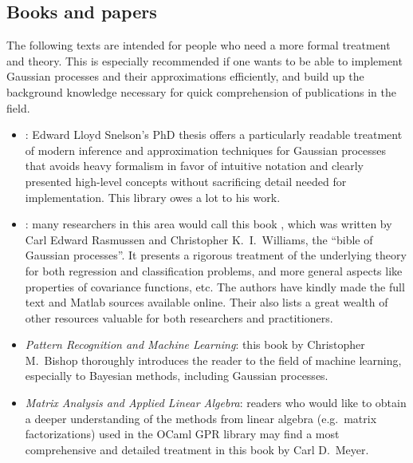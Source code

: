 \documentclass[10pt]{report}
\begin{document}
\subsection{Books and papers}

The following texts are intended for people who need a more formal treatment and
theory.  This is especially recommended if one wants to be able to implement
Gaussian processes and their approximations efficiently, and build up the
background knowledge necessary for quick comprehension of publications in the
field.

\begin{itemize}

\item
\emph{}: Edward Lloyd
Snelson's PhD thesis \cite{SnelsonThesis} offers a particularly readable
treatment of modern inference and approximation techniques for Gaussian
processes that avoids heavy formalism in favor of intuitive notation and
clearly presented high-level concepts without sacrificing detail needed
for implementation.  This library owes a lot to his work.

\item \emph{}: many researchers in this area would call this book
\cite{oai:eprints.pascal-network.org:1211}, which was written by Carl Edward
Rasmussen and Christopher K.\ I.\ Williams, the ``bible of Gaussian processes''.
It presents a rigorous treatment of the underlying theory for both regression
and classification problems, and more general aspects like properties of
covariance functions, etc.  The authors have kindly made the full text and
Matlab sources available online.  Their
 also lists
a great wealth of other resources valuable for both researchers and
practitioners.

\item \emph{Pattern Recognition and Machine Learning}: this book
\cite{BishopMachLearn} by Christopher M.\ Bishop thoroughly introduces the
reader to the field of machine learning, especially to Bayesian methods,
including Gaussian processes.

\item \emph{Matrix Analysis and Applied Linear Algebra}: readers who would like
to obtain a deeper understanding of the methods from linear algebra (e.g.\
matrix factorizations) used in the OCaml GPR library may find a most comprehensive and
detailed treatment in this book \cite{MatrixAnalysis} by Carl D.\ Meyer.

\end{itemize}
\end{document}
